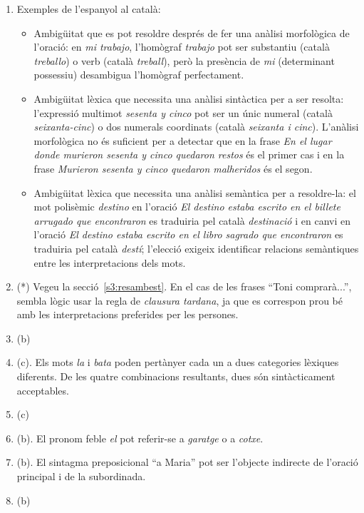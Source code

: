 \begin{enumerate}
  \item Exemples de l'espanyol al català:
    \begin{itemize}
    \item Ambigüitat que es pot resoldre després de fer una anàlisi
      morfològica de l'oració: en \emph{mi trabajo}, l'homògraf
      \emph{trabajo} pot ser substantiu (català \emph{treballo}) o
      verb (català \emph{treball}), però la presència de \emph{mi}
      (determinant possessiu) desambigua l'homògraf perfectament.
    \item Ambigüitat lèxica que necessita una anàlisi sintàctica per a
      ser resolta: l'expressió multimot \emph{sesenta y cinco} pot ser
      un únic numeral (català \emph{seixanta-cinc}) o dos numerals
      coordinats (català \emph{seixanta i cinc}). L'anàlisi
      morfològica no és suficient per a detectar que en la frase
      \emph{En el lugar donde murieron sesenta y cinco quedaron
        restos} és el primer cas i en la frase \emph{Murieron sesenta
        y cinco quedaron malheridos} és el segon.
    \item Ambigüitat lèxica que necessita una anàlisi semàntica per a
      resoldre-la: el mot polisèmic \emph{destino} en l'oració
      \emph{El destino estaba escrito en el billete arrugado que
        encontraron} es traduiria pel català \emph{destinació} i en
      canvi en l'oració \emph{El destino estaba escrito en el libro
        sagrado que encontraron} es traduiria pel català \emph{destí};
      l'elecció exigeix identificar relacions semàntiques entre les
      interpretacions dels mots.

    \end{itemize}


      
    \item(*) Vegeu la secció~\ref{s3:resambest}.  En el cas de les
      frases ``Toni comprarà...'', sembla lògic usar la regla de {\em
        clausura tardana}, ja que es correspon prou bé amb les
      interpretacions preferides per les persones.

\item (b)
\item (c). Els mots \emph{la} i \emph{bata} poden pertànyer cada un
  a dues categories lèxiques diferents. De les quatre combinacions
  resultants, dues són sintàcticament acceptables.
\item (c)
\item (b). El pronom feble \emph{el} pot referir-se a \emph{garatge}
  o a \emph{cotxe}.
\item (b). El sintagma preposicional ``a Maria'' pot ser l'objecte
  indirecte de l'oració principal i de la subordinada.
\item (b)


\end{enumerate}
